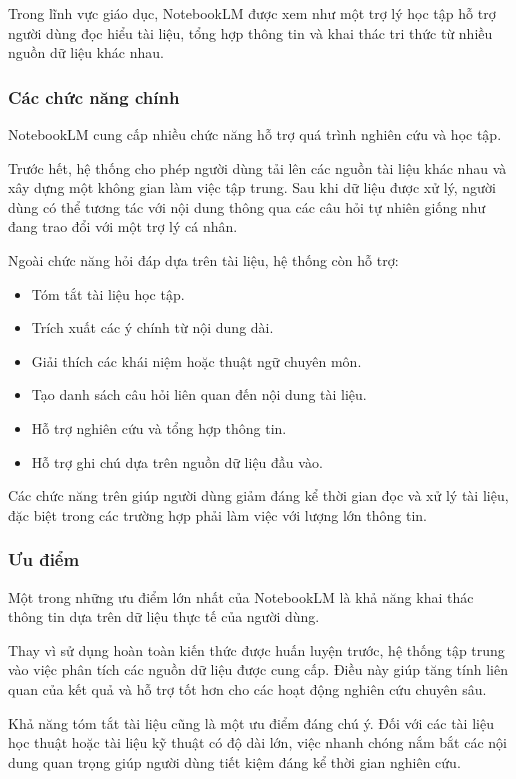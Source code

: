 Trong lĩnh vực giáo dục, NotebookLM được xem như một trợ lý học tập hỗ trợ người dùng đọc hiểu tài liệu, tổng hợp thông tin và khai thác tri thức từ nhiều nguồn dữ liệu khác nhau.

\subsubsection{Các chức năng chính}

NotebookLM cung cấp nhiều chức năng hỗ trợ quá trình nghiên cứu và học tập.

Trước hết, hệ thống cho phép người dùng tải lên các nguồn tài liệu khác nhau và xây dựng một không gian làm việc tập trung. Sau khi dữ liệu được xử lý, người dùng có thể tương tác với nội dung thông qua các câu hỏi tự nhiên giống như đang trao đổi với một trợ lý cá nhân.

Ngoài chức năng hỏi đáp dựa trên tài liệu, hệ thống còn hỗ trợ:
\begin{itemize}
    \item Tóm tắt tài liệu học tập.
    \item Trích xuất các ý chính từ nội dung dài.
    \item Giải thích các khái niệm hoặc thuật ngữ chuyên môn.
    \item Tạo danh sách câu hỏi liên quan đến nội dung tài liệu.
    \item Hỗ trợ nghiên cứu và tổng hợp thông tin.
    \item Hỗ trợ ghi chú dựa trên nguồn dữ liệu đầu vào.
\end{itemize}

Các chức năng trên giúp người dùng giảm đáng kể thời gian đọc và xử lý tài liệu, đặc biệt trong các trường hợp phải làm việc với lượng lớn thông tin.

\subsubsection{Ưu điểm}

Một trong những ưu điểm lớn nhất của NotebookLM là khả năng khai thác thông tin dựa trên dữ liệu thực tế của người dùng.

Thay vì sử dụng hoàn toàn kiến thức được huấn luyện trước, hệ thống tập trung vào việc phân tích các nguồn dữ liệu được cung cấp. Điều này giúp tăng tính liên quan của kết quả và hỗ trợ tốt hơn cho các hoạt động nghiên cứu chuyên sâu.

Khả năng tóm tắt tài liệu cũng là một ưu điểm đáng chú ý. Đối với các tài liệu học thuật hoặc tài liệu kỹ thuật có độ dài lớn, việc nhanh chóng nắm bắt các nội dung quan trọng giúp người dùng tiết kiệm đáng kể thời gian nghiên cứu.

